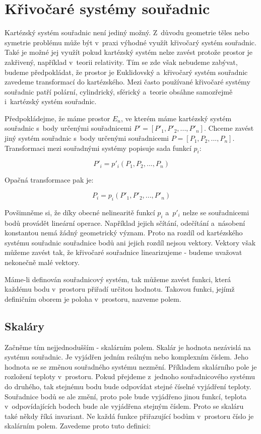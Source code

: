 \chapter{Křivočaré systémy souřadnic}
\label{sec:krivocare_systemy_souradnic}

Kartézský systém souřadnic není jediný možný. Z~důvodu geometrie těles nebo symetrie problému může být v~praxi výhodné využít křivočarý systém souřadnic. Také je možné jej využít pokud kartézský systém nelze zavést protože prostor je zakřivený, například v~teorii relativity. Tím se zde však nebudeme zabývat, budeme předpokládat, že prostor je Euklidovský a~křivočarý systém souřadnic zavedeme transformací do kartézského. Mezi často používané křivočaré systémy souřadnic patří polární, cylindrický, sférický a~teorie obsáhne samozřejmě i~kartézský systém souřadnic.

Předpokládejme, že máme prostor \(E_n\), ve kterém máme kartézský systém souřadnic s~body určenými souřadnicemi \(P' = [P'_1, P'_2, ..., P'_n]\). Chceme zavést jiný systém souřadnic s~body určenými souřadnicemi \(P = [P_1, P_2, ..., P_n]\). Transformaci mezi souřadnými systémy popisuje sada funkcí \(p_i\):

\begin{equation}
P'_i = p'_i(P_1, P_2, ..., P_n)
\end{equation}

Opačná transformace pak je:

\begin{equation}
P_i = p_i(P'_1, P'_2, ..., P'_n)
\end{equation}

Povšimněme si, že díky obecné nelinearitě funkcí \(p_i\) a~\(p'_i\) nelze se souřadnicemi bodů provádět lineární operace. Například jejich sčítání, odečítání a~násobení konstantou nemá žádný geometrický význam. Proto na rozdíl od kartézského systému souřadnic souřadnice bodů ani jejich rozdíl nejsou vektory. Vektory však můžeme zavést tak, že křivočaré souřadnice linearizujeme - budeme uvažovat nekonečně malé vektory.

Máme-li definován souřadnicový systém, tak můžeme zavést funkci, která každému bodu v~prostoru přiřadí určitou hodnotu. Takovou funkci, jejímž definičním oborem je poloha v~prostoru, nazveme polem. 

\section{Skaláry}

Začněme tím nejjednodušším - skalárním polem. Skalár je hodnota nezávislá na systému souřadnic. Je vyjádřen jedním reálným nebo komplexním číslem. Jeho hodnota se se změnou souřadného systému nezmění. Příkladem skalárního pole je rozložení teploty v~prostoru. Pokud přejdeme z~jednoho souřadnicového systému do druhého, tak stejnému bodu bude odpovídat stejné číselné vyjádření teploty. Souřadnice bodů se ale změní, proto pole bude vyjádřeno jinou funkcí, teplota v~odpovídajících bodech bude ale vyjádřena stejným číslem. Proto se skaláru také někdy říká invariant. Ne každá funkce přiřazující bodům v~prostoru číslo je skalárním polem. Zavedeme proto tuto definici:

